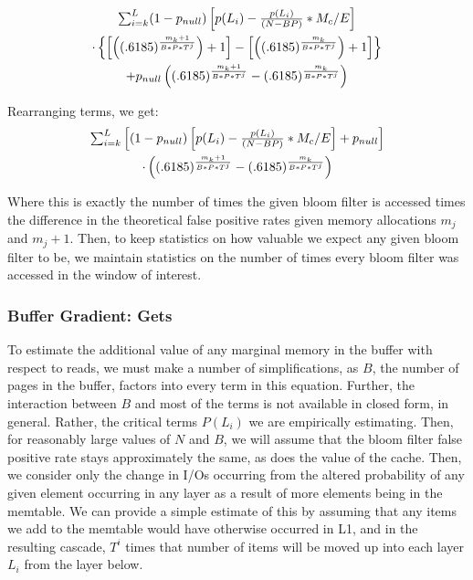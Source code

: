 \documentclass{sig-alternate-05-2015}
\begin{document}
\begin{multline}
$$\sum_{i=k}^{L} (1-p_{null})\left[p(L_i) - \frac{p(L_i)}{(N - BP)} * M_c/E \right] \\ \cdot \left\{ \left[ \left( (.6185) ^  {\frac{m_k+1}{B*P*T^j}}\right) +1 \right] - \left[ \left( (.6185) ^  {\frac{m_k}{B*P*T^j}}\right) +1 \right] \right\} \\+ p_{null}  \left( (.6185) ^  {\frac{m_k+1}{B*P*T^j}} - (.6185) ^  {\frac{m_k}{B*P*T^j}}\right)$$
\end{multline}

Rearranging terms, we get:
\begin{multline}
$$\sum_{i=k}^{L} \left[(1-p_{null})\left[p(L_i) - \frac{p(L_i)}{(N - BP)} * M_c/E \right] +  p_{null} \right] \\ \cdot \left( (.6185) ^  {\frac{m_k+1}{B*P*T^j}} - (.6185) ^  {\frac{m_k}{B*P*T^j}}\right)$$
\end{multline}

Where this is exactly the number of times the given bloom filter is accessed
times the difference in the theoretical false positive rates given memory
allocations $m_j$ and $m_j+1$. Then, to keep statistics on how valuable we
expect any given bloom filter to be, we maintain statistics on the number of
times every bloom filter was accessed in the window of interest.

\subsubsection{Buffer Gradient: Gets}

To estimate the additional value of any marginal memory in the buffer with
respect to reads, we must make a number of simplifications, as $B$, the number
of pages in the buffer, factors into every term in this equation. Further, the
interaction between $B$ and most of the terms is not available in closed form,
in general. Rather, the critical terms $P(L_i)$ we are empirically estimating.
Then, for reasonably large values of $N$ and $B$, we will assume that the bloom
filter false positive rate stays approximately the same, as does the value of
the cache. Then, we consider only the change in I/Os occurring from the altered
probability of any given element occurring in any layer as a result of more
elements being in the memtable. We can provide a simple estimate
of this by assuming that any items we add to the memtable would have
otherwise occurred in L1, and in the resulting cascade, $T^{i}$ times that number of items will be moved up into 
each layer $L_{i}$ from the layer below.
\end{document}
